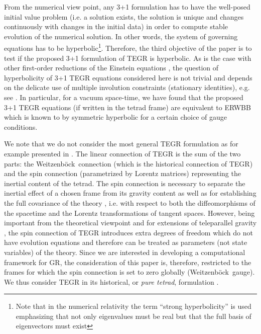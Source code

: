 \documentclass[
10pt, %
a4paper, %
oneside, %
twocolumn,
headinclude,footinclude, %
BCOR5mm, %
]{scrartcl}
\newcommand{\We}{Weitzenb\"ock}
\begin{document}
	From the numerical view point, any 3+1 formulation has to have the
	well-posed initial value problem (i.e. a solution exists, the solution is
	unique and changes continuously with changes in the initial data) in order
	to compute stable evolution of the numerical solution. In other words, the
	system of governing equations has to be hyperbolic\footnote{Note that in the
	numerical relativity the term ``strong hyperbolicity'' is used emphasizing
	that not only eigenvalues must be real but that the full basis of
	eigenvectors must exist}. Therefore, the third objective of the paper is to
	test if the proposed 3+1 formulation of TEGR is hyperbolic. As is the
	case with other first-order reductions of the Einstein equations
	\cite{Baumgarte2003a}, the question of hyperbolicity of 3+1 TEGR
	equations considered here is not trivial and depends on the delicate use of
	multiple involution constraints (stationary identities), e.g. see
	\cite{FO-CCZ4}. In particular, for a vacuum space-time, we have found that
	the proposed 3+1 TEGR equations (if written in the tetrad frame) are
	equivalent to ERWBB \cite{Estabrook1997,Buchman2003} which is known to by
	symmetric hyperbolic for a certain choice of gauge conditions.
	
	We note that we do not consider the most general TEGR formulation as for
	example presented in \cite{AldrovandiPereiraBook}. The linear connection of
	TEGR is the sum of the two parts: the \We\ connection (which is the
	historical connection of TEGR) and the spin connection (parametrized by
	Lorentz matrices) representing the inertial content of the tetrad. The spin
	connection is necessary to separate the inertial effect of a chosen frame
	from its gravity content as well as for establishing the full covariance of
	the theory \cite{AldrovandiPereiraBook,Golovnev2017a,Krssak2019}, i.e. with
	respect to both the diffeomorphisms of the spacetime and the Lorentz
	transformations of tangent spaces. However, being important from the
	theoretical viewpoint and for extensions of teleparallel gravity
	\cite{Golovnev2017a}, the spin connection of TEGR introduces extra degrees
	of freedom which do not have evolution equations and therefore can be
	treated as parameters (not state variables) of the theory. Since we are
	interested in developing a computational framework for GR, the consideration
	of this paper is, therefore, restricted to the frames for which the spin
	connection is set to zero globally (\We\ gauge). We thus consider TEGR in
	its historical, or \emph{pure tetrad}, formulation \cite{Golovnev2017a}.
	
\end{document}
